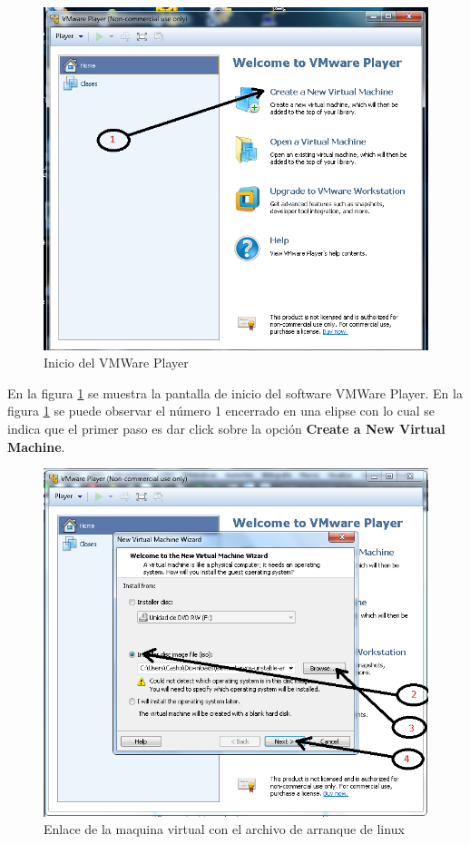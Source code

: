 \documentclass[12pt, twoside]{report}
\begin{document}
\begin{figure}
	\centering
	\includegraphics[width=1.0\linewidth]{VMwarePlayerInicio.png}
	\caption{Inicio del VMWare Player}
	\label{fig1009}
\end{figure}

En la figura \ref{fig1009} se muestra la pantalla de inicio del software VMWare Player. En la figura \ref{fig1009} se puede observar el número 1 encerrado en una elipse con lo cual se indica que el primer paso es dar click sobre la opción \textbf{Create a New Virtual Machine}.


\begin{figure}
	\centering
	\includegraphics[width=1.0\linewidth]{VMwarePlayer2y3.png}
	\caption{Enlace de la maquina virtual con el archivo de arranque de linux}
	\label{fig1010}
\end{figure}
\end{document}
